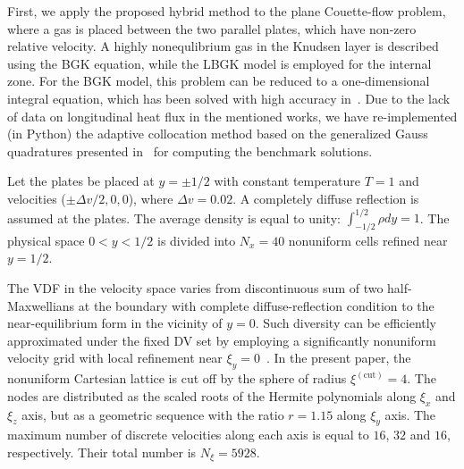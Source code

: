 \documentclass{elsarticle} %
\begin{document}
First, we apply the proposed hybrid method to the plane Couette-flow problem,
where a gas is placed between the two parallel plates, which have non-zero relative velocity.
A highly nonequlibrium gas in the Knudsen layer is described using the BGK equation, while the LBGK model is employed for the internal zone.
For the BGK model, this problem can be reduced to a one-dimensional integral equation,
which has been solved with high accuracy in~\cite{Luo2015, Luo2016}.
Due to the lack of data on longitudinal heat flux in the mentioned works, we have re-implemented (in Python)
the adaptive collocation method based on the generalized Gauss quadratures presented in~\cite{Luo2016}
for computing the benchmark solutions.

Let the plates be placed at \(y = \pm 1/2\) with constant temperature \(T = 1\) and velocities (\(\pm\Delta v/2,0,0\)),
where \(\Delta v=0.02\). A completely diffuse reflection is assumed at the plates.
The average density is equal to unity: \(\int_{-1/2}^{1/2}\rho dy=1\).
The physical space \(0 < y < 1/2\) is divided into \(N_x = 40\) nonuniform cells refined near \(y = 1/2\).

The VDF in the velocity space varies from discontinuous sum of two half-Maxwellians at the boundary
with complete diffuse-reflection condition to the near-equilibrium form in the vicinity of \(y=0\).
Such diversity can be efficiently approximated under the fixed DV set by employing
a significantly nonuniform velocity grid with local refinement near \(\xi_y=0\)~\cite{Ohwada1990, Wu2014, Rogozin2016}.
In the present paper, the nonuniform Cartesian lattice is cut off by the sphere of radius \(\xi^{(\mathrm{cut})}=4\).
The nodes are distributed as the scaled roots of the Hermite polynomials along \(\xi_x\) and \(\xi_z\) axis,
but as a geometric sequence with the ratio \(r = 1.15\) along \(\xi_y\) axis.
The maximum number of discrete velocities along each axis is equal to \(16\), \(32\) and \(16\), respectively.
Their total number is \(N_\xi=5928\).
\end{document}

